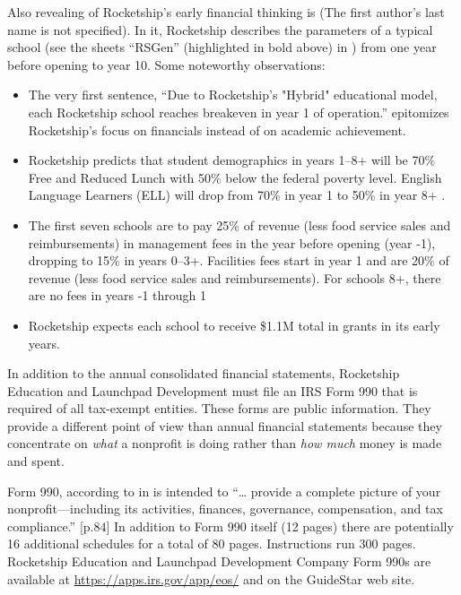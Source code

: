 Also revealing of Rocketship's early financial thinking is  \parencite{FinNarr2010} (The first author's last name is not specified). In it, Rocketship describes the parameters of a typical school (see the sheets ``RSGen'' (highlighted in bold above) in \textcite{RSED2009a}) from one year before opening to year 10. Some noteworthy observations:
\begin{itemize}
  \item The very first sentence, ``Due to Rocketship's "Hybrid" educational model, each Rocketship school reaches breakeven in year 1 of operation.'' \parencite[1]{FinNarr2010} epitomizes Rocketship's focus on financials instead of on academic achievement.
  \item Rocketship predicts that student demographics in years 1–8+ will be 70\% Free and Reduced Lunch with 50\% below the federal poverty level. English Language Learners (ELL) will drop from 70\% in year 1 to 50\% in year 8+ \parencite[1]{FinNarr2010}.
  \item The first seven schools are to pay 25\% of revenue (less food service sales and reimbursements) in management fees in the year before opening (year -1), dropping to 15\% in years 0–3+. Facilities fees start in year 1 and are 20\% of revenue (less food service sales and reimbursements). For schools 8+, there are no fees in years -1 through 1

  \item Rocketship expects each school to receive \$1.1M total in grants in its early years.
\end{itemize}

In addition to the annual consolidated financial statements, Rocketship Education and Launchpad Development must file an IRS Form 990 that is required of all tax-exempt entities. These forms are public information. They provide a different point of view than annual financial statements because they concentrate on \textit{what} a nonprofit is doing rather than \textit{how much} money is made and spent.

Form 990, according to  in  is intended to ``\ldots{} provide a complete picture of your nonprofit—including its activities, finances, governance, compensation, and tax compliance.'' [p.84] In addition to Form 990 itself (12 pages) there are potentially 16 additional schedules for a total of 80 pages. Instructions run 300 pages. Rocketship Education and Launchpad Development Company Form 990s are available at \url{https://apps.irs.gov/app/eos/} and on the GuideStar web site.

